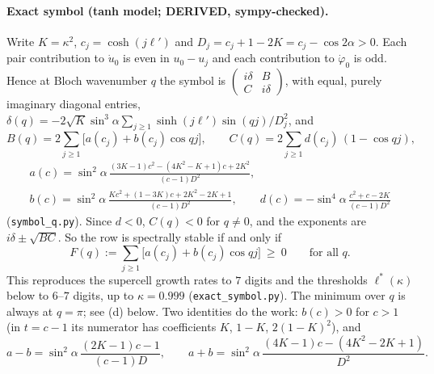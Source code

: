 \documentclass[11pt]{article}
\theoremstyle{remark}
\begin{document}
\paragraph{Exact symbol (tanh model; DERIVED, sympy-checked).} Write $K=\kappa^2$, $c_j=\cosh(j\ell')$ and
$D_j=c_j+1-2K=c_j-\cos2\alpha>0$. Each pair contribution to $\dot u_0$ is even in $u_0-u_j$ and each contribution to
$\dot\varphi_0$ is odd. Hence at Bloch wavenumber $q$ the symbol is $\left(\begin{smallmatrix}i\delta&B\\C&i\delta\end{smallmatrix}\right)$,
with equal, purely imaginary diagonal entries, $\delta(q)=-2\sqrt K\sin^3\!\alpha\sum_{j\ge1}\sinh(j\ell')\sin(qj)/D_j^2$, and
\[
B(q)=2\sum_{j\ge1}\big[a(c_j)+b(c_j)\cos qj\big],\qquad C(q)=2\sum_{j\ge1}d(c_j)\,(1-\cos qj),
\]
\begin{gather*}
a(c)=\sin^2\!\alpha\,\frac{(3K-1)c^2-(4K^2-K+1)c+2K^2}{(c-1)D^2},\\
b(c)=\sin^2\!\alpha\,\frac{Kc^2+(1-3K)c+2K^2-2K+1}{(c-1)D^2},\qquad
d(c)=-\sin^4\!\alpha\,\frac{c^2+c-2K}{(c-1)D^2}
\end{gather*}
(\texttt{symbol\_q.py}). Since $d<0$, $C(q)<0$ for $q\ne0$, and the exponents are $i\delta\pm\sqrt{BC}$. So the row is spectrally
stable if and only if
\[
F(q):=\sum_{j\ge1}\big[a(c_j)+b(c_j)\cos qj\big]\ \ge\ 0\qquad\text{for all }q .
\]
This reproduces the supercell growth rates to $7$ digits and the thresholds $\ell^*(\kappa)$ below to $6$--$7$ digits, up to
$\kappa=0.999$ (\texttt{exact\_symbol.py}). The minimum over $q$ is always at $q=\pi$; see (d) below. Two
identities do the work: $b(c)>0$ for $c>1$ (in $t=c-1$ its numerator has coefficients $K$, $1-K$, $2(1-K)^2$), and
\[
a-b=\sin^2\!\alpha\,\frac{(2K-1)c-1}{(c-1)D},\qquad a+b=\sin^2\!\alpha\,\frac{(4K-1)c-(4K^2-2K+1)}{D^2}.
\]
\end{document}

